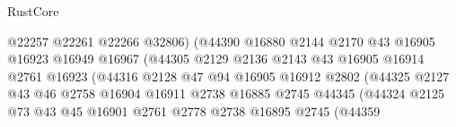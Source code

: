 \begin{lexlean}{RustCore}
\begin{coremodule}
                                        @22257
                                        @22261
                                        @22266
                                        @32806)
                                      (@44390
                                        @16880
                                        @2144
                                        @2170
                                        @43
                                        @16905
                                        @16923
                                        @16949
                                        @16967
                                        (@44305
                                          @2129
                                          @2136
                                          @2143
                                          @43
                                          @16905
                                          @16914
                                          @2761
                                          @16923
                                          (@44316
                                            @2128
                                            @47
                                            @94
                                            @16905
                                            @16912
                                            @2802
                                            (@44325
                                              @2127
                                              @43
                                              @46
                                              @2758
                                              @16904
                                              @16911
                                              @2738
                                              @16885
                                              @2745
                                              @44345
                                              (@44324
                                                @2125
                                                @73
                                                @43
                                                @45
                                                @16901
                                                @2761
                                                @2778
                                                @2738
                                                @16895
                                                @2745
                                                (@44359

\end{coremodule}
\end{lexlean}
